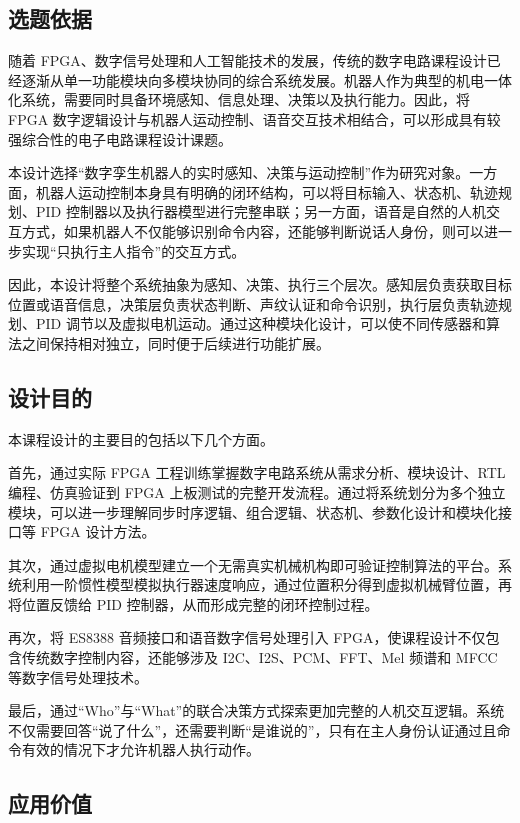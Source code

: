\documentclass[UTF8,zihao=-4,fontset=windows]{ctexart}
\begin{document}
\subsection{选题依据}

随着 FPGA、数字信号处理和人工智能技术的发展，传统的数字电路课程设计已经逐渐从单一功能模块向多模块协同的综合系统发展。机器人作为典型的机电一体化系统，需要同时具备环境感知、信息处理、决策以及执行能力。因此，将 FPGA 数字逻辑设计与机器人运动控制、语音交互技术相结合，可以形成具有较强综合性的电子电路课程设计课题。

本设计选择“数字孪生机器人的实时感知、决策与运动控制”作为研究对象。一方面，机器人运动控制本身具有明确的闭环结构，可以将目标输入、状态机、轨迹规划、PID 控制器以及执行器模型进行完整串联；另一方面，语音是自然的人机交互方式，如果机器人不仅能够识别命令内容，还能够判断说话人身份，则可以进一步实现“只执行主人指令”的交互方式。

因此，本设计将整个系统抽象为感知、决策、执行三个层次。感知层负责获取目标位置或语音信息，决策层负责状态判断、声纹认证和命令识别，执行层负责轨迹规划、PID 调节以及虚拟电机运动。通过这种模块化设计，可以使不同传感器和算法之间保持相对独立，同时便于后续进行功能扩展。

\subsection{设计目的}

本课程设计的主要目的包括以下几个方面。

首先，通过实际 FPGA 工程训练掌握数字电路系统从需求分析、模块设计、RTL 编程、仿真验证到 FPGA 上板测试的完整开发流程。通过将系统划分为多个独立模块，可以进一步理解同步时序逻辑、组合逻辑、状态机、参数化设计和模块化接口等 FPGA 设计方法。

其次，通过虚拟电机模型建立一个无需真实机械机构即可验证控制算法的平台。系统利用一阶惯性模型模拟执行器速度响应，通过位置积分得到虚拟机械臂位置，再将位置反馈给 PID 控制器，从而形成完整的闭环控制过程。

再次，将 ES8388 音频接口和语音数字信号处理引入 FPGA，使课程设计不仅包含传统数字控制内容，还能够涉及 I2C、I2S、PCM、FFT、Mel 频谱和 MFCC 等数字信号处理技术。

最后，通过“Who”与“What”的联合决策方式探索更加完整的人机交互逻辑。系统不仅需要回答“说了什么”，还需要判断“是谁说的”，只有在主人身份认证通过且命令有效的情况下才允许机器人执行动作。

\subsection{应用价值}
\end{document}
